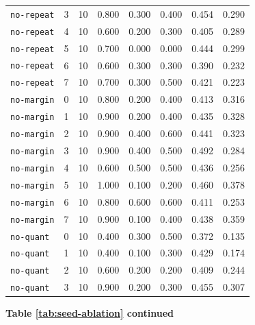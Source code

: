 \documentclass{article}
\begin{document}
\begin{center}
{\begin{tabular}{lllccccc}
\texttt{no-repeat} & 3 & 10 & 0.800 & 0.300 & 0.400 & 0.454 & 0.290 \\
\texttt{no-repeat} & 4 & 10 & 0.600 & 0.200 & 0.300 & 0.405 & 0.289 \\
\texttt{no-repeat} & 5 & 10 & 0.700 & 0.000 & 0.000 & 0.444 & 0.299 \\
\texttt{no-repeat} & 6 & 10 & 0.600 & 0.300 & 0.300 & 0.390 & 0.232 \\
\texttt{no-repeat} & 7 & 10 & 0.700 & 0.300 & 0.500 & 0.421 & 0.223 \\
\texttt{no-margin} & 0 & 10 & 0.800 & 0.200 & 0.400 & 0.413 & 0.316 \\
\texttt{no-margin} & 1 & 10 & 0.900 & 0.200 & 0.400 & 0.435 & 0.328 \\
\texttt{no-margin} & 2 & 10 & 0.900 & 0.400 & 0.600 & 0.441 & 0.323 \\
\texttt{no-margin} & 3 & 10 & 0.900 & 0.400 & 0.500 & 0.492 & 0.284 \\
\texttt{no-margin} & 4 & 10 & 0.600 & 0.500 & 0.500 & 0.436 & 0.256 \\
\texttt{no-margin} & 5 & 10 & 1.000 & 0.100 & 0.200 & 0.460 & 0.378 \\
\texttt{no-margin} & 6 & 10 & 0.800 & 0.600 & 0.600 & 0.411 & 0.253 \\
\texttt{no-margin} & 7 & 10 & 0.900 & 0.100 & 0.400 & 0.438 & 0.359 \\
\texttt{no-quant} & 0 & 10 & 0.400 & 0.300 & 0.500 & 0.372 & 0.135 \\
\texttt{no-quant} & 1 & 10 & 0.400 & 0.100 & 0.300 & 0.429 & 0.174 \\
\texttt{no-quant} & 2 & 10 & 0.600 & 0.200 & 0.200 & 0.409 & 0.244 \\
\texttt{no-quant} & 3 & 10 & 0.900 & 0.200 & 0.300 & 0.455 & 0.307 \\
\bottomrule
\end{tabular}%
}
\end{center}
\begin{center}
\textbf{Table \ref{tab:seed-ablation} continued}\\[0.4ex]
\end{center}
\normalsize
\end{document}
